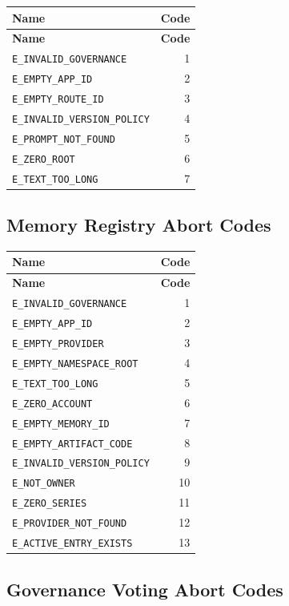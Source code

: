 \documentclass[11pt]{article}
\newcommand{\code}[1]{\texttt{#1}}
\begin{document}
\begin{longtable}{lr}
\toprule
\textbf{Name} & \textbf{Code} \\
\midrule
\endfirsthead
\toprule
\textbf{Name} & \textbf{Code} \\
\midrule
\endhead
\code{E\_INVALID\_GOVERNANCE} & 1 \\
\code{E\_EMPTY\_APP\_ID} & 2 \\
\code{E\_EMPTY\_ROUTE\_ID} & 3 \\
\code{E\_INVALID\_VERSION\_POLICY} & 4 \\
\code{E\_PROMPT\_NOT\_FOUND} & 5 \\
\code{E\_ZERO\_ROOT} & 6 \\
\code{E\_TEXT\_TOO\_LONG} & 7 \\
\bottomrule
\end{longtable}

\subsection{Memory Registry Abort Codes}

\begin{longtable}{lr}
\toprule
\textbf{Name} & \textbf{Code} \\
\midrule
\endfirsthead
\toprule
\textbf{Name} & \textbf{Code} \\
\midrule
\endhead
\code{E\_INVALID\_GOVERNANCE} & 1 \\
\code{E\_EMPTY\_APP\_ID} & 2 \\
\code{E\_EMPTY\_PROVIDER} & 3 \\
\code{E\_EMPTY\_NAMESPACE\_ROOT} & 4 \\
\code{E\_TEXT\_TOO\_LONG} & 5 \\
\code{E\_ZERO\_ACCOUNT} & 6 \\
\code{E\_EMPTY\_MEMORY\_ID} & 7 \\
\code{E\_EMPTY\_ARTIFACT\_CODE} & 8 \\
\code{E\_INVALID\_VERSION\_POLICY} & 9 \\
\code{E\_NOT\_OWNER} & 10 \\
\code{E\_ZERO\_SERIES} & 11 \\
\code{E\_PROVIDER\_NOT\_FOUND} & 12 \\
\code{E\_ACTIVE\_ENTRY\_EXISTS} & 13 \\
\bottomrule
\end{longtable}

\subsection{Governance Voting Abort Codes}
\end{document}

